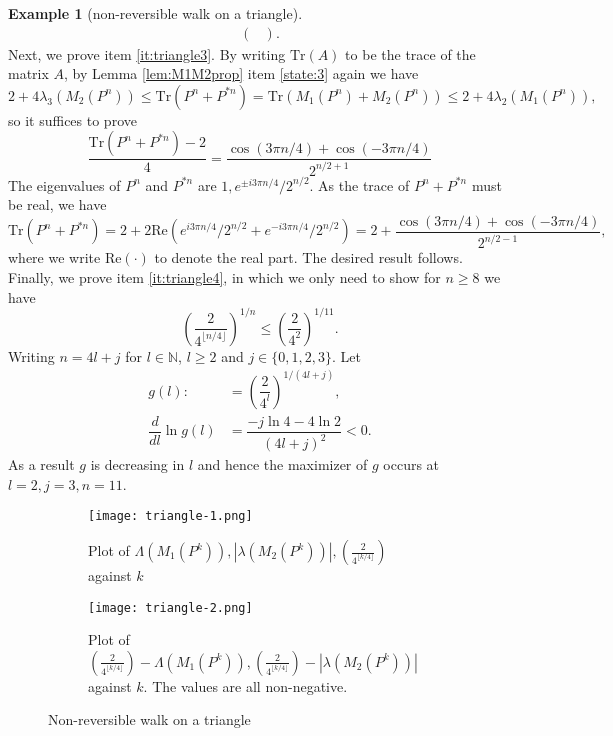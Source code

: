 \documentclass[12pt,a4]{amsart}
\numberwithin{equation}{section}
\theoremstyle{plain}
\theoremstyle{definition}
\newtheorem{example}{Example}[section]
\theoremstyle{remark}
\let\oldendproof\endproof
\renewenvironment{proof}[1][\proofname]{%
  \oldproof[\noindent\textbf{#1.} ]%
}{\oldendproof}
\newcommand{\1}{\mathds{1}}
\renewcommand{\leq}{\leqslant}
\renewcommand{\geq}{\geqslant}
\begin{document}
\begin{example}[non-reversible walk on a triangle]
\begin{proof}
\begin{align*}
\begin{pmatrix}
		\end{pmatrix}.
		\end{align*}
		Next, we prove item \eqref{it:triangle3}. By writing $\mathrm{Tr}(A)$ to be the trace of the matrix $A$, by Lemma \ref{lem:M1M2prop} item \ref{state:3} again we have
		$$2 + 4 \lambda_3(M_2(P^n)) \leq \mathrm{Tr}(P^n + P^{*n}) = \mathrm{Tr}(M_1(P^n) + M_2(P^n)) \leq 2 + 4 \lambda_2(M_1(P^n)),$$
		so it suffices to prove 
		$$\dfrac{\mathrm{Tr}(P^n + P^{*n}) - 2}{4} =  \dfrac{\cos(3\pi n/4) + \cos(-3\pi n/4)}{2^{n/2+1}}$$
		The eigenvalues of $P^n$ and $P^{*n}$ are $1, e^{\pm i 3\pi n/4}/2^{n/2}$. As the trace of $P^n + P^{*n}$ must be real, we have
		$$\mathrm{Tr}(P^n + P^{*n}) = 2 + 2 \mathrm{Re}(e^{i 3\pi n/4}/2^{n/2} + e^{-i 3\pi n/4}/2^{n/2}) = 2 + \dfrac{\cos(3\pi n/4) + \cos(-3\pi n/4)}{2^{n/2-1}},$$
		where we write $\mathrm{Re}(\cdot)$ to denote the real part. The desired result follows. Finally, we prove item \eqref{it:triangle4}, in which we only need to show for $n \geq 8$ we have
		$$\left(\dfrac{2}{4^{\lfloor n/4\rfloor}}\right)^{1/n} \leq \left(\dfrac{2}{4^2}\right)^{1/11}.$$
		Writing $n = 4l + j$ for $l \in \mathbb{N}$, $l \geq 2$ and $j \in \{0,1,2,3\}$. Let
		\begin{align*}
			g(l) :&= \left(\dfrac{2}{4^l}\right)^{1/(4l+j)}, \\
			\dfrac{d}{dl} \ln g(l) &= \dfrac{-j \ln 4 - 4 \ln 2}{(4l+j)^2} < 0.
		\end{align*}
		As a result $g$ is decreasing in $l$ and hence the maximizer of $g$ occurs at $l = 2, j = 3, n = 11$.
	\end{proof}
	
\begin{figure}[H]
	\centering
	\begin{subfigure}{0.5\textwidth}
		\centering
		\texttt{[image: triangle-1.png]}
		\caption{Plot of $\Lambda(M_1(P^k)), |\lambda(M_2(P^k))|, \left(\frac{2}{4^{\lfloor k/4\rfloor}}\right)$ against $k$}
	\end{subfigure}%
	\begin{subfigure}{0.5\textwidth}
		\centering
		\texttt{[image: triangle-2.png]}
		\caption{Plot of $\left(\frac{2}{4^{\lfloor k/4\rfloor}}\right) - \Lambda(M_1(P^k)), \left(\frac{2}{4^{\lfloor k/4\rfloor}}\right) - |\lambda(M_2(P^k))|$ against $k$. The values are all non-negative.}
	\end{subfigure}
	\caption{Non-reversible walk on a triangle}
	\label{fig:triangle}
\end{figure}
\end{example}
\end{document}
